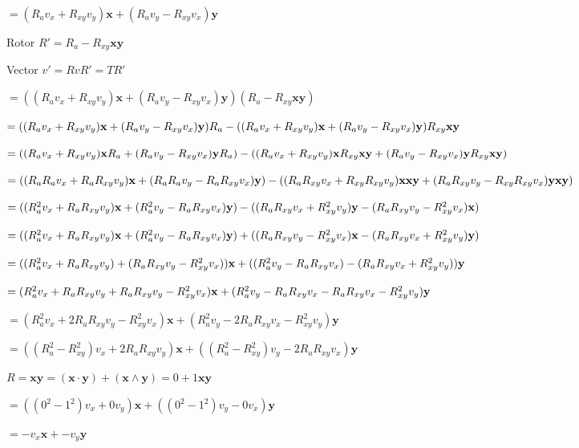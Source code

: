 \documentclass[14pt]{extarticle}
\begin{document}
\(
  = (R_a v_x + R_{xy} v_y) \mathbf{x}
  + (R_a v_y - R_{xy} v_x) \mathbf{y}
\)

Rotor \( R' = R_a - R_{xy} \mathbf{xy} \)

Vector \( v' = R v R' = T R' \)

\(
  = ((R_a v_x + R_{xy} v_y) \mathbf{x} + (R_a v_y - R_{xy} v_x) \mathbf{y})
  (R_a - R_{xy} \mathbf{xy})
\)

\(
  = ((R_a v_x + R_{xy} v_y) \mathbf{x}
     + (R_a v_y - R_{xy} v_x) \mathbf{y}) R_a \\
  - ((R_a v_x + R_{xy} v_y) \mathbf{x}
     + (R_a v_y - R_{xy} v_x) \mathbf{y}) R_{xy} \mathbf{xy}
\)

\(
  = ((R_a v_x + R_{xy} v_y) \mathbf{x} R_a
     + (R_a v_y - R_{xy} v_x) \mathbf{y} R_a) \\
  - ((R_a v_x + R_{xy} v_y) \mathbf{x} R_{xy} \mathbf{xy}
     + (R_a v_y - R_{xy} v_x) \mathbf{y} R_{xy} \mathbf{xy})
\)

\(
  = ((R_a R_a v_x + R_a R_{xy} v_y) \mathbf{x}
     + (R_a R_a v_y - R_a R_{xy} v_x) \mathbf{y}) \\
  - ((R_a R_{xy} v_x + R_{xy} R_{xy} v_y) \mathbf{xxy}
     + (R_a R_{xy} v_y - R_{xy} R_{xy} v_x) \mathbf{yxy})
\)

\(
  = ((R_a^2 v_x + R_a R_{xy} v_y) \mathbf{x}
     + (R_a^2 v_y - R_a R_{xy} v_x) \mathbf{y}) \\
  - ((R_a R_{xy} v_x + R_{xy}^2 v_y) \mathbf{y}
     - (R_a R_{xy} v_y - R_{xy}^2 v_x) \mathbf{x})
\)

\(
  = ((R_a^2 v_x + R_a R_{xy} v_y) \mathbf{x}
     + (R_a^2 v_y - R_a R_{xy} v_x) \mathbf{y}) \\
  + ((R_a R_{xy} v_y - R_{xy}^2 v_x) \mathbf{x}
     - (R_a R_{xy} v_x + R_{xy}^2 v_y) \mathbf{y})
\)

\(
  = ((R_a^2 v_x + R_a R_{xy} v_y)
     + (R_a R_{xy} v_y - R_{xy}^2 v_x)) \mathbf{x} \\
  + ((R_a^2 v_y - R_a R_{xy} v_x)
     - (R_a R_{xy} v_x + R_{xy}^2 v_y)) \mathbf{y}
\)

\(
  = (R_a^2 v_x + R_a R_{xy} v_y + R_a R_{xy} v_y - R_{xy}^2 v_x) \mathbf{x} \\
  + (R_a^2 v_y - R_a R_{xy} v_x - R_a R_{xy} v_x - R_{xy}^2 v_y) \mathbf{y}
\)

\(
  = (R_a^2 v_x + 2 R_a R_{xy} v_y - R_{xy}^2 v_x) \mathbf{x}
  + (R_a^2 v_y - 2 R_a R_{xy} v_x - R_{xy}^2 v_y) \mathbf{y}
\)

\(
  = ((R_a^2 - R_{xy}^2) v_x + 2 R_a R_{xy} v_y) \mathbf{x}
  + ((R_a^2 - R_{xy}^2) v_y - 2 R_a R_{xy} v_x) \mathbf{y}
\)

\(
  R = \mathbf{xy}
  = (\mathbf{x} \cdot \mathbf{y}) + (\mathbf{x} \wedge \mathbf{y})
  = 0 + 1 \mathbf{xy}
\)

\(
  = ((0^2 - 1^2) v_x + 0 v_y) \mathbf{x}
  + ((0^2 - 1^2) v_y - 0 v_x) \mathbf{y}
\)

\(
  = - v_x \mathbf{x} + - v_y \mathbf{y}
\)
\end{document}
